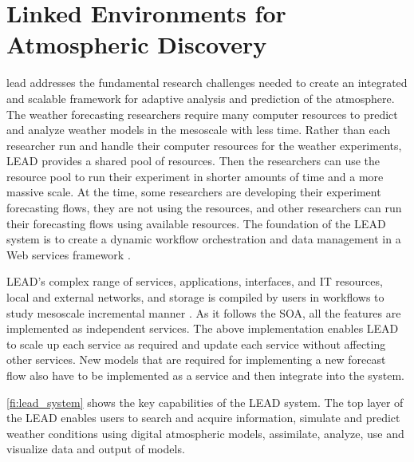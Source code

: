 \section{Linked Environments for Atmospheric Discovery}
\label{se:lead}

\acrfull{lead} \cite{Droegemeier2005Service-OrientedWeather} addresses the fundamental research challenges needed to create an integrated and scalable framework for adaptive analysis and prediction of the atmosphere. The weather forecasting researchers require many computer resources to predict and analyze weather models in the mesoscale with less time. Rather than each researcher run and handle their computer resources for the weather experiments, LEAD provides a shared pool of resources. Then the researchers can use the resource pool to run their experiment in shorter amounts of time and a more massive scale. At the time, some researchers are developing their experiment forecasting flows, they are not using the resources, and other researchers can run their forecasting flows using available resources. The foundation of the LEAD system is to create a dynamic workflow orchestration and data management in a Web services framework \cite{Droegemeier2005Service-OrientedWeather}.

LEAD's complex range of services, applications, interfaces, and IT resources, local and external networks, and storage is compiled by users in workflows to study mesoscale incremental manner \cite{Droegemeier2005Service-OrientedWeather}. As it follows the SOA, all the features are implemented as independent services. The above implementation enables LEAD to scale up each service as required and update each service without affecting other services. New models that are required for implementing a new forecast flow also have to be implemented as a service and then integrate into the system.

\cref{fi:lead_system} shows the key capabilities of the LEAD system. The top layer of the LEAD enables users to search and acquire information, simulate and predict weather conditions using digital atmospheric models, assimilate, analyze, use and visualize data and output of models.

